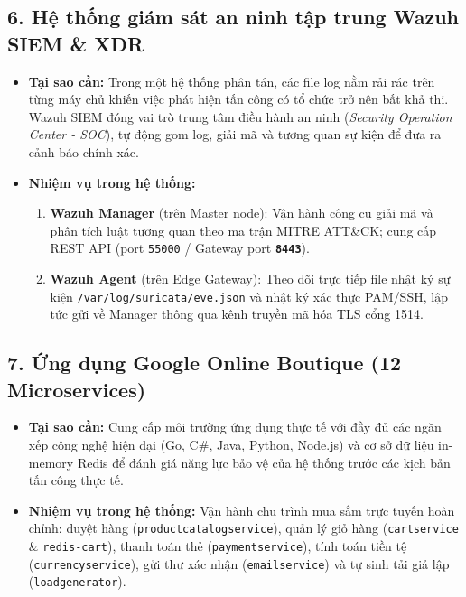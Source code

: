 \subsection{6. Hệ thống giám sát an ninh tập trung Wazuh SIEM \& XDR}
\begin{itemize}
    \item \textbf{Tại sao cần:} Trong một hệ thống phân tán, các file log nằm rải rác trên từng máy chủ khiến việc phát hiện tấn công có tổ chức trở nên bất khả thi. Wazuh SIEM đóng vai trò trung tâm điều hành an ninh (\textit{Security Operation Center - SOC}), tự động gom log, giải mã và tương quan sự kiện để đưa ra cảnh báo chính xác.
    \item \textbf{Nhiệm vụ trong hệ thống:}
    \begin{enumerate}
        \item \textbf{Wazuh Manager} (trên Master node): Vận hành công cụ giải mã và phân tích luật tương quan theo ma trận MITRE ATT\&CK; cung cấp REST API (port \texttt{55000} / Gateway port \textbf{\texttt{8443}}).
        \item \textbf{Wazuh Agent} (trên Edge Gateway): Theo dõi trực tiếp file nhật ký sự kiện \texttt{/var/log/suricata/eve.json} và nhật ký xác thực PAM/SSH, lập tức gửi về Manager thông qua kênh truyền mã hóa TLS cổng 1514.
    \end{enumerate}
\end{itemize}

\subsection{7. Ứng dụng Google Online Boutique (12 Microservices)}
\begin{itemize}
    \item \textbf{Tại sao cần:} Cung cấp môi trường ứng dụng thực tế với đầy đủ các ngăn xếp công nghệ hiện đại (Go, C\#, Java, Python, Node.js) và cơ sở dữ liệu in-memory Redis để đánh giá năng lực bảo vệ của hệ thống trước các kịch bản tấn công thực tế.
    \item \textbf{Nhiệm vụ trong hệ thống:} Vận hành chu trình mua sắm trực tuyến hoàn chỉnh: duyệt hàng (\texttt{productcatalogservice}), quản lý giỏ hàng (\texttt{cartservice} \& \texttt{redis-cart}), thanh toán thẻ (\texttt{paymentservice}), tính toán tiền tệ (\texttt{currencyservice}), gửi thư xác nhận (\texttt{emailservice}) và tự sinh tải giả lập (\texttt{loadgenerator}).
\end{itemize}

